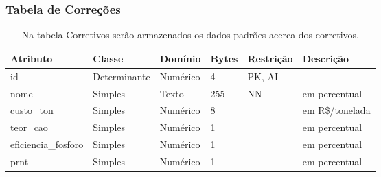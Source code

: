 \begin{landscape}
    \subsubsection{Tabela de Correções}
    \label{sec:titSubSecAnalises}

    \begin{table}[H]
        \centering
        \caption[Tabela \textbf{Corretivos}]{Na tabela Corretivos serão armazenados os dados padrões acerca dos corretivos.
            \label{tab:tabela-er-correcoes}}
        \begin{tabular}{|p{4cm}|p{3cm}|p{2cm}|p{1cm}|p{2cm}|p{8cm}|}
            \hline
            Atributo            & Classe       & Domínio  & Bytes & Restrição & Descrição       \\\hline
            id                  & Determinante & Numérico & 4     & PK, AI    &                 \\\hline
            nome                & Simples      & Texto    & 255   & NN        & em percentual   \\\hline
            custo\_ton          & Simples      & Numérico & 8     &           & em R\$/tonelada \\\hline
            teor\_cao           & Simples      & Numérico & 1     &           & em percentual   \\\hline
            eficiencia\_fosforo & Simples      & Numérico & 1     &           & em percentual   \\\hline
            prnt                & Simples      & Numérico & 1     &           & em percentual   \\\hline
        \end{tabular}
    \end{table}

\end{landscape}